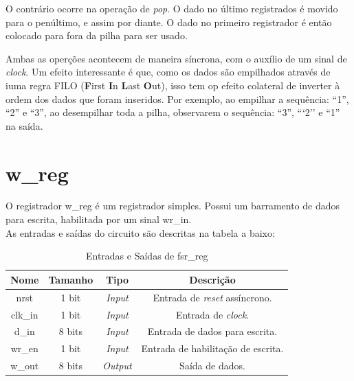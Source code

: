 \documentclass{article}
\begin{document}
O contrário ocorre na operação de \textit{pop}. O dado no último registrados é movido para o penúltimo, e assim por diante. O dado no primeiro registrador é então colocado para fora da pilha para ser usado.

Ambas as operções acontecem de maneira síncrona, com o auxílio de um sinal de \textit{clock}. Um efeito interessante é que, como os dados são empilhados através de iuma regra FILO (\textbf{F}irst \textbf{I}n \textbf{L}ast \textbf{O}ut), isso tem op efeito colateral de inverter à ordem dos dados que foram inseridos. Por exemplo, ao empilhar a sequência: ``1'', ``2'' e ``3'', ao desempilhar toda a pilha, observarem o sequência: ``3'', ```2'' e ``1'' na saída.

\newpage

\section{w\_reg}

O registrador w\_reg é um registrador simples. Possui um barramento de dados para escrita, habilitada por um sinal wr\_in.\\

As entradas e saídas do circuito são descritas na tabela a baixo:\\

\begin{table}[ht]
    \begin{center}
        \begin{tabular}{|c|c|c|c|}
            \hline
            Nome & Tamanho & Tipo & Descrição\\
            \hline
            nrst & 1 bit & \textit{Input} & Entrada de \textit{reset} assíncrono.\\
            \hline
            clk\_in & 1 bit & \textit{Input} & Entrada de \textit{clock}.\\
            \hline
            d\_in & 8 bits & \textit{Input} & Entrada de dados para escrita.\\
            \hline
            wr\_en & 1 bit & \textit{Input} & Entrada de habilitação de escrita.\\
            \hline
            w\_out & 8 bits & \textit{Output} & Saída de dados.\\
            \hline
        \end{tabular}
    \end{center}
    \caption{Entradas e Saídas de fsr\_reg}
\end{table}
\end{document}
